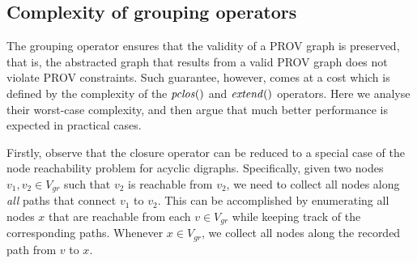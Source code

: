 % 
% 
% 
%

\subsection{Complexity of grouping operators}  \label{sec:complexity}


The grouping operator ensures that the validity of a PROV graph is preserved, that is, the abstracted graph that results from a valid PROV graph does not violate PROV constraints.
Such guarantee, however, comes at a cost which is defined by the complexity of the $\mathit{pclos}()$ and $\mathit{extend}()$ operators.
Here we analyse their worst-case complexity, and then argue that much better performance is expected in practical cases.

Firstly, observe that the closure operator can be reduced to a special case of the node reachability problem for acyclic digraphs.
Specifically, given two nodes $v_1, v_2 \in V_{gr}$ such that $v_2$ is reachable from $v_2$, we need to collect all nodes along \textit{all} paths that connect $v_1$ to $v_2$.
This can be accomplished by enumerating all nodes $x$ that are reachable from each $v \in V_{gr}$ while keeping track of the corresponding paths. Whenever $ x \in V_{gr}$, we collect all nodes along the recorded path from $v$ to $x$.

